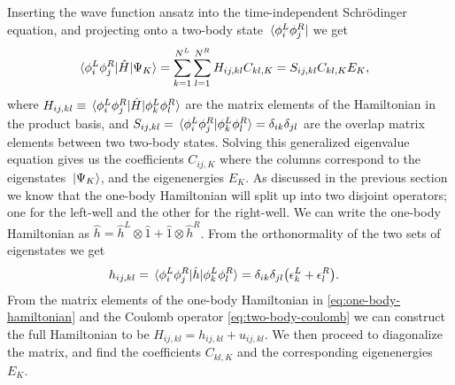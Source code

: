 \documentclass[twocolumn,superscriptaddress,unsortedaddress,
 amsmath,amssymb,
 aps,
]{revtex4-2}
\begin{document}
        Inserting the wave function ansatz into the time-independent Schrödinger
        equation, and projecting onto a two-body state
        $\bra*{\phi^L_i \phi^R_j}$ we get
        \begin{align*}
            \mel*{\phi^L_i \phi^R_j}{\hat{H}}{\Psi_K}
            &= \sum_{k = 1}^{N^L} \sum_{l = 1}^{N^R}
            H_{ij, kl} C_{kl, K}
            = S_{ij, kl} C_{kl, K} E_{K},
        \end{align*}
        where $H_{ij, kl} \equiv \mel*{\phi^L_i \phi^R_j}{\hat{H}}{
        \phi^L_k \phi^R_l}$ are the matrix elements of the Hamiltonian in
        the product basis, and $S_{ij, kl} = \braket*{
        \phi^L_i \phi^R_j}{\phi^L_k \phi^R_l} = \delta_{ik} \delta_{jl}$ are
        the overlap matrix elements between two two-body states.
        Solving this generalized eigenvalue equation gives us the
        coefficients $C_{ij, K}$ where the columns correspond to the
        eigenstates $\ket*{\Psi_K}$, and the eigenenergies $E_K$.
        As discussed in the previous section we know that the one-body Hamiltonian
        will split up into two disjoint operators; one for the left-well and the
        other for the right-well.
        We can write the one-body Hamiltonian as $\hat{h} = \hat{h}^L \otimes \hat{1}
        + \hat{1} \otimes \hat{h}^{R}$.
        From the orthonormality of the two sets of eigenstates we get
        \begin{align}
            h_{ij, kl}
            &= \mel*{\phi^L_i \phi^R_j}{\hat{h}}{\phi^L_k \phi^R_l}
            = \delta_{ik} \delta_{jl} \qty(
                \epsilon^L_k
                + \epsilon^{R}_l
            ).
            \label{eq:one-body-hamiltonian}
        \end{align}
        From the matrix elements of the one-body Hamiltonian in
        \eqref{eq:one-body-hamiltonian} and the Coulomb operator
        \eqref{eq:two-body-coulomb} we can construct the full Hamiltonian
        to be $H_{ij, kl} = h_{ij, kl} + u_{ij, kl}$.
        We then proceed to diagonalize the matrix, and find the coefficients
        $C_{kl, K}$ and the corresponding eigenenergies $E_K$.
\end{document}
